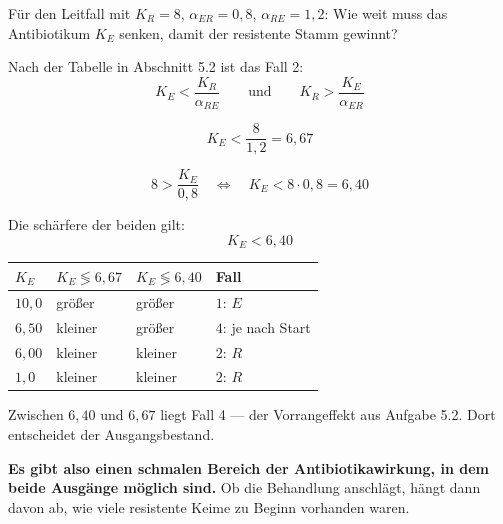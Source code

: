 \begin{aufgabe}
Für den Leitfall mit $K_R = 8$, $\alpha_{ER} = 0{,}8$, $\alpha_{RE} = 1{,}2$: Wie weit muss das Antibiotikum $K_E$ senken, damit der resistente Stamm gewinnt?

\loesung
{}
Nach der Tabelle in Abschnitt 5.2 ist das Fall 2:
\[ K_E < \frac{K_R}{\alpha_{RE}} \qquad\text{und}\qquad K_R > \frac{K_E}{\alpha_{ER}} \]

\[ K_E < \frac{8}{1{,}2} = 6{,}67 \]

\[ 8 > \frac{K_E}{0{,}8} \quad\Longleftrightarrow\quad K_E < 8 \cdot 0{,}8 = 6{,}40 \]

Die schärfere der beiden gilt:
\[ K_E < 6{,}40 \]

\begin{center}
{\small
\renewcommand{\arraystretch}{1.48}
\begin{tabular}{@{}P{1.8cm}P{2.4cm}P{2.4cm}P{1.6cm}@{}}
\toprule
$K_E$ & $K_E \lessgtr 6{,}67$ & $K_E \lessgtr 6{,}40$ & \textbf{Fall}\\
\midrule
$10{,}0$ & größer & größer & $1$: $E$\\
$6{,}50$ & kleiner & größer & \textcolor{akzent}{$4$: je nach Start}\\
$6{,}00$ & kleiner & kleiner & $2$: $R$\\
$1{,}0$ & kleiner & kleiner & $2$: $R$\\
\bottomrule
\end{tabular}}
\end{center}

Zwischen $6{,}40$ und $6{,}67$ liegt Fall 4 --- der Vorrangeffekt aus Aufgabe 5.2. Dort entscheidet der Ausgangsbestand.

\begin{center}
\begin{minipage}{0.9\textwidth}
\textbf{Es gibt also einen schmalen Bereich der Antibiotikawirkung, in dem beide Ausgänge möglich sind.} Ob die Behandlung anschlägt, hängt dann davon ab, wie viele resistente Keime zu Beginn vorhanden waren.
\end{minipage}
\end{center}

\begin{center}
\begin{minipage}{0.88\textwidth}
\end{minipage}
\end{center}


\end{aufgabe}
